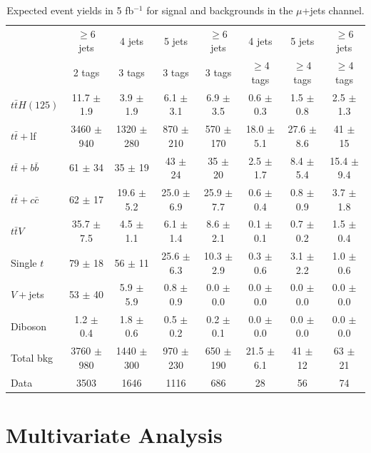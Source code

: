 \begin{table}
\begin{adjustwidth}{-1.7in}{-1.7in}
  \centering
  \noindent
  \small
    \caption{Expected event yields in 5 fb$^{-1}$ for signal and backgrounds in the $\mu$+jets channel.}
    \label{tab:dataMC_LJeventyield_mu}
    \begin{tabular}{|l|c|c|c|c|c|c|c|} \hline
& $\geq$6 jets & 4 jets & 5 jets & $\geq$6 jets & 4 jets & 5 jets & $\geq$6 jets \\
& 2 tags & 3 tags & 3 tags & 3 tags & $\geq$4 tags & $\geq$4 tags & $\geq$4 tags \\ \hline \hline
$t\bar{t}H(125)$ & 11.7 $\pm$ 1.9 & 3.9 $\pm$ 1.9 & 6.1 $\pm$ 3.1 & 6.9 $\pm$ 3.5 & 0.6 $\pm$ 0.3 & 1.5 $\pm$ 0.8 & 2.5 $\pm$ 1.3 \\
 \hline
$t\bar{t}+$lf & 3460 $\pm$ 940 & 1320 $\pm$ 280 & 870 $\pm$ 210 & 570 $\pm$ 170 & 18.0 $\pm$ 5.1 & 27.6 $\pm$ 8.6 & 41 $\pm$ 15 \\
$t\bar{t}+b\bar{b}$ & 61 $\pm$ 34 & 35 $\pm$ 19 & 43 $\pm$ 24 & 35 $\pm$ 20 & 2.5 $\pm$ 1.7 & 8.4 $\pm$ 5.4 & 15.4 $\pm$ 9.4 \\
$t\bar{t}+c\bar{c}$ & 62 $\pm$ 17 & 19.6 $\pm$ 5.2 & 25.0 $\pm$ 6.9 & 25.9 $\pm$ 7.7 & 0.6 $\pm$ 0.4 & 0.8 $\pm$ 0.9 & 3.7 $\pm$ 1.8 \\
$t\bar{t}V$ & 35.7 $\pm$ 7.5 & 4.5 $\pm$ 1.1 & 6.1 $\pm$ 1.4 & 8.6 $\pm$ 2.1 & 0.1 $\pm$ 0.1 & 0.7 $\pm$ 0.2 & 1.5 $\pm$ 0.4 \\
Single $t$ & 79 $\pm$ 18 & 56 $\pm$ 11 & 25.6 $\pm$ 6.3 & 10.3 $\pm$ 2.9 & 0.3 $\pm$ 0.6 & 3.1 $\pm$ 2.2 & 1.0 $\pm$ 0.6 \\
$V+$jets & 53 $\pm$ 40 & 5.9 $\pm$ 5.9 & 0.8 $\pm$ 0.9 & 0.0 $\pm$ 0.0 & 0.0 $\pm$ 0.0 & 0.0 $\pm$ 0.0 & 0.0 $\pm$ 0.0 \\
Diboson & 1.2 $\pm$ 0.4 & 1.8 $\pm$ 0.6 & 0.5 $\pm$ 0.2 & 0.2 $\pm$ 0.1 & 0.0 $\pm$ 0.0 & 0.0 $\pm$ 0.0 & 0.0 $\pm$ 0.0 \\
 \hline
Total bkg & 3760 $\pm$ 980 & 1440 $\pm$ 300 & 970 $\pm$ 230 & 650 $\pm$ 190 & 21.5 $\pm$ 6.1 & 41 $\pm$ 12 & 63 $\pm$ 21 \\
 \hline
Data & 3503 & 1646 & 1116 & 686 & 28 & 56 & 74 \\
\hline
\end{tabular}
  \end{adjustwidth}
\end{table}



\section{Multivariate Analysis}
\label{mva_overview}

